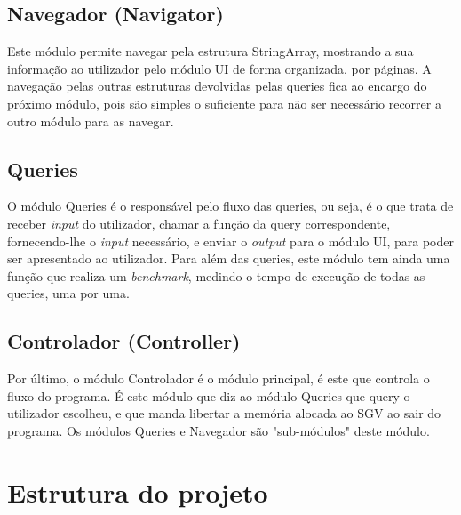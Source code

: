 \documentclass[a4paper]{report}
\begin{document}
	\section{Navegador (Navigator)}
	Este módulo permite navegar pela estrutura StringArray, mostrando a sua informação ao utilizador pelo módulo UI de forma organizada, por páginas. A navegação pelas outras estruturas devolvidas pelas queries fica ao encargo do próximo módulo, pois são simples o suficiente para não ser necessário recorrer a outro módulo para as navegar.
	
	\section{Queries}
	O módulo Queries é o responsável pelo fluxo das queries, ou seja, é o que trata de receber \textit{input} do utilizador, chamar a função da query correspondente, fornecendo-lhe o \textit{input} necessário, e enviar o \textit{output} para o módulo UI, para poder ser apresentado ao utilizador. Para além das queries, este módulo tem ainda uma função que realiza um \textit{benchmark}, medindo o tempo de execução de todas as queries, uma por uma.
	
	\section{Controlador (Controller)}
	Por último, o módulo Controlador é o módulo principal, é este que controla o fluxo do programa. É este módulo que diz ao módulo Queries que query o utilizador escolheu, e que manda libertar a memória alocada ao SGV ao sair do programa. Os módulos Queries e Navegador são "sub-módulos" deste módulo.
	
	\chapter{Estrutura do projeto}
	
\end{document}

